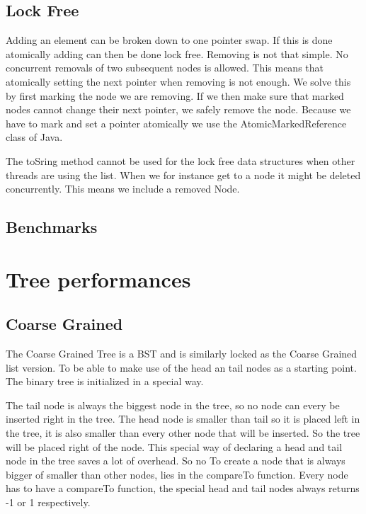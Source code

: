 \documentclass[10pt,a4paper]{article}
\begin{document}
\subsection{Lock Free}
Adding an element can be broken down to one pointer swap. If this is done atomically adding can then be done lock free. Removing is not that simple. No concurrent removals of two subsequent nodes is allowed. This means that atomically setting the next pointer when removing is not enough. We solve this by first marking the node we are removing. If we then make sure that marked nodes cannot change their next pointer, we safely remove the node. Because we have to mark and set a pointer atomically we use the AtomicMarkedReference class of Java.

The toSring method cannot be used for the lock free data structures when other threads are using the list. When we for instance get to a node it might be deleted concurrently. This means we include a removed Node.


\subsection{Benchmarks}

\section{Tree performances}
\subsection{Coarse Grained}
The Coarse Grained Tree is a BST and is similarly locked as the Coarse Grained list version. To be able to make use of the head an tail nodes as a starting point. The binary tree is initialized in a special way. 

\begin{figure}[h!]
\centerline{
}
\end{figure}

The tail node is always the biggest node in the tree, so no node can every be inserted right in the tree. The head node is smaller than tail so it is placed left in the tree, it is also smaller than every other node that will be inserted. So the tree will be placed right of the node. This special way of 
declaring a head and tail node in the tree saves a lot of overhead. So no
To create a node that is always bigger of smaller than other nodes, lies in the compareTo function. Every node has to have a compareTo function, the special head and tail nodes always returns -1 or 1 respectively.
\end{document}
